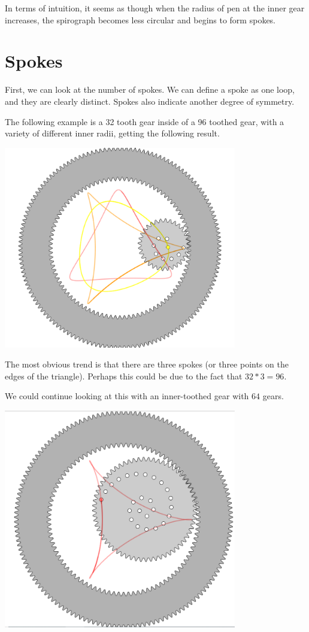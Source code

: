 \documentclass{article}
\begin{document}
In terms of intuition, it seems as though when the radius of pen at the inner gear increases, the spirograph becomes less circular and begins to form spokes.

\section{Spokes}

First, we can look at the number of spokes. We can define a spoke as one loop, and they are clearly distinct. Spokes also indicate another degree of symmetry.

The following example is a 32 tooth gear inside of a 96 toothed gear, with a variety of different inner radii, getting the following result. 

\begin{center}
\includegraphics[width=4in]{images/Spokes.png}
\end{center}

The most obvious trend is that there are three spokes (or three points on the edges of the triangle). Perhaps this could be due to the fact that $32 * 3 = 96.$

We could continue looking at this with an inner-toothed gear with $64$ gears. 

\begin{center}
\includegraphics[width=4in]{images/Gear72.png}
\end{center}
\end{document}

